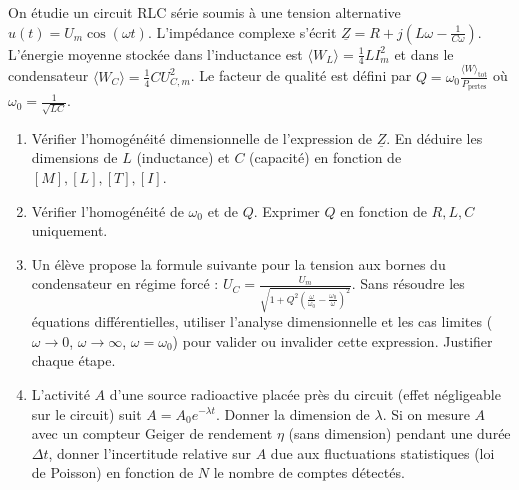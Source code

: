 \documentclass[11pt]{article}
\begin{document}
\begin{exercice}
On étudie un circuit RLC série soumis à une tension alternative $u(t) = U_m \cos(\omega t)$. L'impédance complexe s'écrit $\underline{Z} = R + j\left(L\omega - \frac{1}{C\omega}\right)$. L'énergie moyenne stockée dans l'inductance est $\langle W_L \rangle = \frac{1}{4} L I_m^2$ et dans le condensateur $\langle W_C \rangle = \frac{1}{4} C U_{C,m}^2$. Le facteur de qualité est défini par $Q = \omega_0 \frac{\langle W \rangle_{\text{tot}}}{P_{\text{pertes}}}$ où $\omega_0 = \frac{1}{\sqrt{LC}}$.

\begin{enumerate}
    \item Vérifier l'homogénéité dimensionnelle de l'expression de $\underline{Z}$. En déduire les dimensions de $L$ (inductance) et $C$ (capacité) en fonction de $[M], [L], [T], [I]$.
    \item Vérifier l'homogénéité de $\omega_0$ et de $Q$. Exprimer $Q$ en fonction de $R, L, C$ uniquement.
    \item Un élève propose la formule suivante pour la tension aux bornes du condensateur en régime forcé : $U_C = \frac{U_m}{\sqrt{1 + Q^2\left(\frac{\omega}{\omega_0} - \frac{\omega_0}{\omega}\right)^2}}$. Sans résoudre les équations différentielles, utiliser l'analyse dimensionnelle et les cas limites ($\omega \to 0$, $\omega \to \infty$, $\omega = \omega_0$) pour valider ou invalider cette expression. Justifier chaque étape.
    \item L'activité $A$ d'une source radioactive placée près du circuit (effet négligeable sur le circuit) suit $A = A_0 e^{-\lambda t}$. Donner la dimension de $\lambda$. Si on mesure $A$ avec un compteur Geiger de rendement $\eta$ (sans dimension) pendant une durée $\Delta t$, donner l'incertitude relative sur $A$ due aux fluctuations statistiques (loi de Poisson) en fonction de $N$ le nombre de comptes détectés.
\end{enumerate}
\end{exercice}
\end{document}
